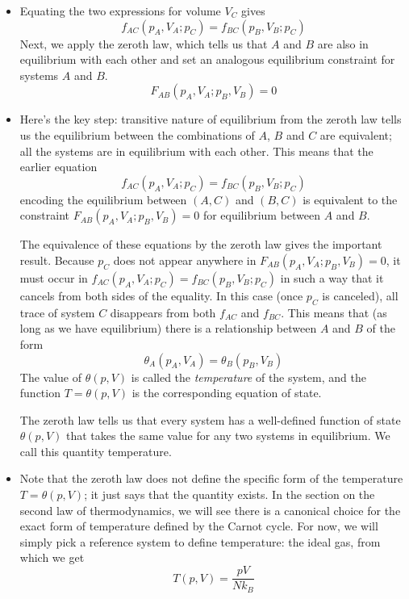 \documentclass[11pt, a4paper]{article}
\begin{document}
\begin{itemize}
	\item Equating the two expressions for volume $ V_{C} $ gives
	\begin{equation*}
		f_{AC}(p_{A}, V_{A}; p_{C}) = f_{BC}(p_{B}, V_{B}; p_{C})
	\end{equation*}
	Next, we apply the zeroth law, which tells us that $ A $ and $ B $ are also in equilibrium with each other and set an analogous equilibrium constraint for systems $ A $ and $ B $. 
	\begin{equation*}
		F_{AB}(p_{A}, V_{A}; p_{B}, V_{B}) = 0
	\end{equation*}
	
	\item Here's the key step: transitive nature of equilibrium from the zeroth law tells us the equilibrium between the combinations of $ A $, $ B $ and $ C $ are equivalent; all the systems are in equilibrium with each other. This means that the earlier equation 
	\begin{equation*}
		f_{AC}(p_{A}, V_{A}; p_{C}) = f_{BC}(p_{B}, V_{B}; p_{C})
	\end{equation*}
	encoding the equilibrium between $ (A, C) $ and $ (B,C) $ is equivalent to the constraint $ F_{AB}(p_{A}, V_{A}; p_{B}, V_{B}) = 0 $ for equilibrium between $ A $ and $ B $.
	
	The equivalence of these equations by the zeroth law gives the important result. Because $ p_{C} $ does not appear anywhere in $ F_{AB}(p_{A}, V_{A}; p_{B}, V_{B}) = 0 $, it must occur in $ f_{AC}(p_{A}, V_{A}; p_{C}) = f_{BC}(p_{B}, V_{B}; p_{C}) $ in such a way that it cancels from both sides of the equality. In this case (once $ p_{C} $ is canceled), all trace of system $ C $ disappears from both $ f_{AC} $ and $ f_{BC} $. This means that (as long as we have equilibrium) there is a relationship between $ A $ and $ B $ of the form
	\begin{equation*}
		\theta_{A}(p_{A}, V_{A}) = \theta_{B}(p_{B}, V_{B})
	\end{equation*}
	The value of $ \theta(p, V) $ is called the \textit{temperature} of the system, and the function $ T = \theta(p, V) $ is the corresponding equation of state.
	
	The zeroth law tells us that every system has a well-defined function of state $ \theta(p, V) $ that takes the same value for any two systems in equilibrium. We call this quantity temperature.
	
	\item Note that the zeroth law does not define the specific form of the temperature $ T = \theta(p, V) $; it just says that the quantity exists. In the section on the second law of thermodynamics, we will see there is a canonical choice for the exact form of temperature defined by the Carnot cycle. For now, we will simply pick a reference system to define temperature: the ideal gas, from which we get
	\begin{equation*}
		T(p, V) = \frac{pV}{Nk_{B}}
	\end{equation*}

\end{itemize}
\end{document}
